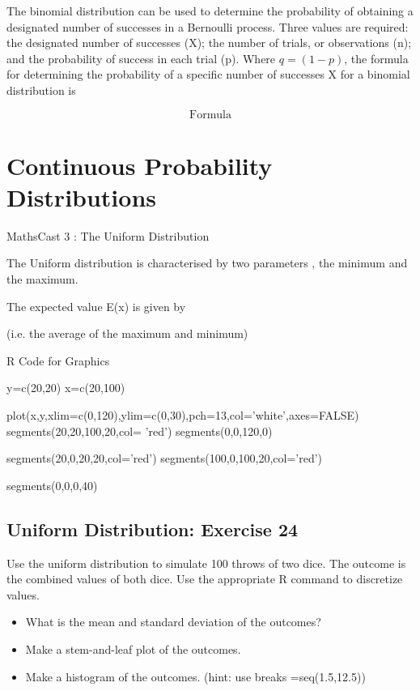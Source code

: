 \documentclass[12pt]{report}
\begin{document}
The binomial distribution can be used to determine the probability of obtaining a designated number of
successes in a Bernoulli process. Three values are required: the designated number of successes (X); the number
of trials, or observations (n); and the probability of success in each trial (p). Where $q = (1 - p)$, the formula for
determining the probability of a specific number of successes X for a binomial distribution is

\[ \mbox{Formula} \]


\chapter{Continuous Probability Distributions}
MathsCast 3 : The Uniform Distribution



The Uniform distribution is characterised by two parameters , the minimum and the maximum.

The expected value E(x) is given by



(i.e. the average of the maximum and minimum)





R Code for Graphics

y=c(20,20)
x=c(20,100)

plot(x,y,xlim=c(0,120),ylim=c(0,30),pch=13,col='white',axes=FALSE)
segments(20,20,100,20,col= 'red')
segments(0,0,120,0)

segments(20,0,20,20,col='red')
segments(100,0,100,20,col='red')

segments(0,0,0,40)

\section*{Uniform Distribution: Exercise 24}

Use the uniform distribution to simulate 100 throws of two dice. The outcome is the combined values of both dice. Use the appropriate R command to discretize values.
\begin{itemize}
	\item  What is the mean and standard deviation of the outcomes?
	\item  Make a stem-and-leaf plot of the outcomes.
	\item Make a histogram of the outcomes. (hint: use breaks =seq(1.5,12.5))
\end{itemize}
\end{document}
